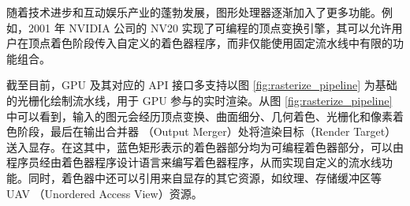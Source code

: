 随着技术进步和互动娱乐产业的蓬勃发展，图形处理器逐渐加入了更多功能。例如，2001 年 NVIDIA 公司的 NV20 实现了可编程的顶点变换引擎\cite{10.1145/383259.383274}，其可以允许用户在顶点着色阶段传入自定义的着色器程序，而非仅能使用固定流水线中有限的功能组合。

截至目前，GPU 及其对应的 API 接口多支持以图 \ref{fig:rasterize_pipeline} 为基础的光栅化绘制流水线，用于 GPU 参与的实时渲染。从图 \ref{fig:rasterize_pipeline} 中可以看到，输入的图元会经历顶点变换、曲面细分、几何着色、光栅化和像素着色阶段，最后在输出合并器 （Output Merger）处将渲染目标（Render Target）送入显存。在这其中，蓝色矩形表示的着色器部分均为可编程着色器部分，可以由程序员经由着色器程序设计语言来编写着色器程序，从而实现自定义的流水线功能。同时，着色器中还可以引用来自显存的其它资源，如纹理、存储缓冲区等 UAV （Unordered Access View）资源。








